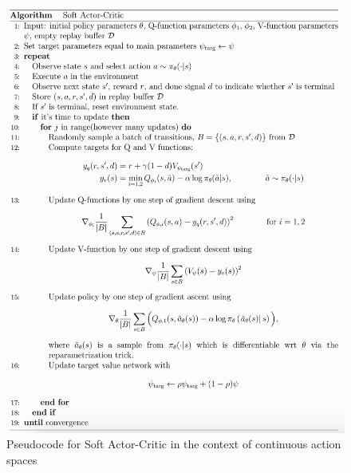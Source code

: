 \documentclass[12pt]{report}
\newtheorem{theorem}{THEOREM}
\newtheorem{definition}[theorem]{DEFINITION}
\newenvironment{proof}{
PROOF:
\begin{quotation}}{
$\Box$ \end{quotation}}
\newcommand{\nats}{\mbox{\( \mathbb N \)}}
\begin{document}
\begin{figure}[H]
    \centering
    \includegraphics[width=0.85\linewidth]{figs/SAC.png}
    \caption{Pseudocode \cite{spinningupRL} for Soft Actor-Critic in the context of continuous action spaces}
    \label{fig:SAC}
\end{figure}



\end{document}
